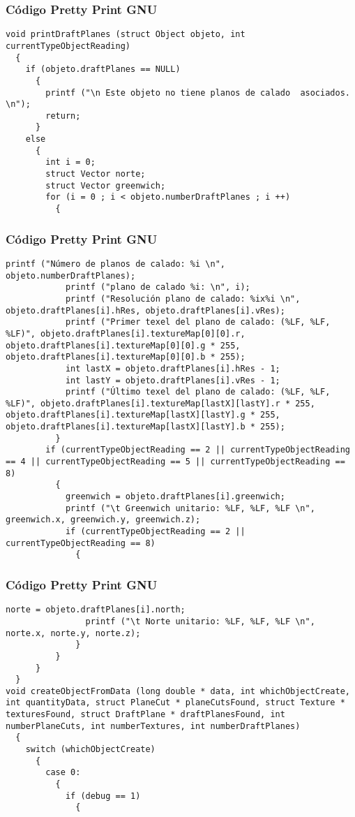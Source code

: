 \documentclass{beamer}
\begin{document}
\begin{frame}[fragile]
\frametitle{C\'odigo Pretty Print GNU}
\begin{lstlisting}[style=CStyle]
void printDraftPlanes (struct Object objeto, int currentTypeObjectReading)
  {
    if (objeto.draftPlanes == NULL)
      {
        printf ("\n Este objeto no tiene planos de calado  asociados. \n");
        return;
      }
    else
      {
        int i = 0;
        struct Vector norte;
        struct Vector greenwich;
        for (i = 0 ; i < objeto.numberDraftPlanes ; i ++)
          {
            \end{lstlisting}
\end{frame}
\begin{frame}[fragile]
\frametitle{C\'odigo Pretty Print GNU}
\begin{lstlisting}[style=CStyle]
            printf ("Número de planos de calado: %i \n", objeto.numberDraftPlanes);
            printf ("plano de calado %i: \n", i);
            printf ("Resolución plano de calado: %ix%i \n", objeto.draftPlanes[i].hRes, objeto.draftPlanes[i].vRes);
            printf ("Primer texel del plano de calado: (%LF, %LF, %LF)", objeto.draftPlanes[i].textureMap[0][0].r, objeto.draftPlanes[i].textureMap[0][0].g * 255, objeto.draftPlanes[i].textureMap[0][0].b * 255);
            int lastX = objeto.draftPlanes[i].hRes - 1;
            int lastY = objeto.draftPlanes[i].vRes - 1;
            printf ("Último texel del plano de calado: (%LF, %LF, %LF)", objeto.draftPlanes[i].textureMap[lastX][lastY].r * 255, objeto.draftPlanes[i].textureMap[lastX][lastY].g * 255, objeto.draftPlanes[i].textureMap[lastX][lastY].b * 255);
          }
        if (currentTypeObjectReading == 2 || currentTypeObjectReading == 4 || currentTypeObjectReading == 5 || currentTypeObjectReading == 8)
          {
            greenwich = objeto.draftPlanes[i].greenwich;
            printf ("\t Greenwich unitario: %LF, %LF, %LF \n", greenwich.x, greenwich.y, greenwich.z);
            if (currentTypeObjectReading == 2 || currentTypeObjectReading == 8)
              {
                \end{lstlisting}
\end{frame}
\begin{frame}[fragile]
\frametitle{C\'odigo Pretty Print GNU}
\begin{lstlisting}[style=CStyle]
                norte = objeto.draftPlanes[i].north;
                printf ("\t Norte unitario: %LF, %LF, %LF \n", norte.x, norte.y, norte.z);
              }
          }
      }
  }
void createObjectFromData (long double * data, int whichObjectCreate, int quantityData, struct PlaneCut * planeCutsFound, struct Texture * texturesFound, struct DraftPlane * draftPlanesFound, int numberPlaneCuts, int numberTextures, int numberDraftPlanes)
  {
    switch (whichObjectCreate)
      {
        case 0:
          {
            if (debug == 1)
              {
                \end{lstlisting}
\end{frame}
\end{document}
